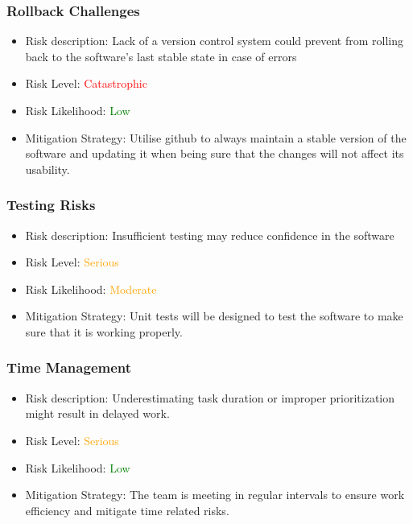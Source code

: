 \documentclass{article}
\begin{document}
\subsubsection{Rollback Challenges}
\begin{itemize}
    \item Risk description: Lack of a version control system could prevent from rolling back to the software's last stable state in case of errors
    \item Risk Level: \textcolor{red}{Catastrophic}
    \item Risk Likelihood: \textcolor{green}{Low}
    \item Mitigation Strategy: Utilise github to always maintain a stable version of the software and updating it when being sure that the changes will not affect its usability. 
\end{itemize}

\subsubsection{Testing Risks}
\begin{itemize}
    \item Risk description: Insufficient testing may reduce confidence in the software
    \item Risk Level: \textcolor{orange}{Serious}
    \item Risk Likelihood: \textcolor{orange}{Moderate}
    \item Mitigation Strategy: Unit tests will be designed to test the software to make sure that it is working properly.
\end{itemize}

\subsubsection{Time Management}
\begin{itemize}
    \item Risk description: Underestimating  task duration or improper prioritization might result in delayed work.
    \item Risk Level: \textcolor{orange}{Serious}
    \item Risk Likelihood: \textcolor{green}{Low}
    \item Mitigation Strategy: The team is meeting in regular intervals to ensure work efficiency and mitigate time related risks.
\end{itemize}
\end{document}

